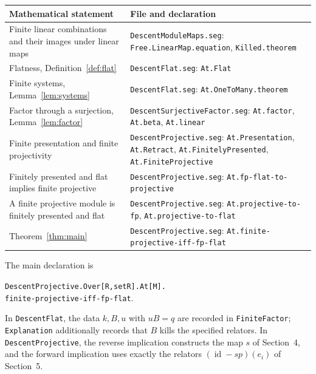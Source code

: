 \documentclass[11pt]{amsart}
\theoremstyle{definition}
\newcommand{\id}{\operatorname{id}}
\newcommand{\code}[1]{\texttt{#1}}
\begin{document}
\smallskip
\noindent
\begin{tabularx}{\textwidth}{@{}>{\raggedright\arraybackslash}p{}>{\raggedright\arraybackslash}X@{}}
\textbf{Mathematical statement} & \textbf{File and declaration} \\
\hline
Finite linear combinations and their images under linear maps &
\code{DescentModuleMaps.seg}: \code{Free.LinearMap.equation},
\code{Killed.theorem} \\[4pt]
Flatness, Definition~\ref{def:flat} &
\code{DescentFlat.seg}: \code{At.Flat} \\[4pt]
Finite systems, Lemma~\ref{lem:systems} &
\code{DescentFlat.seg}: \code{At.OneToMany.theorem} \\[4pt]
Factor through a surjection, Lemma~\ref{lem:factor} &
\code{DescentSurjectiveFactor.seg}: \code{At.factor},
\code{At.beta}, \code{At.linear} \\[4pt]
Finite presentation and finite projectivity &
\code{DescentProjective.seg}: \code{At.Presentation},
\code{At.Retract}, \code{At.FinitelyPresented},
\code{At.FiniteProjective} \\[4pt]
Finitely presented and flat implies finite projective &
\code{DescentProjective.seg}: \code{At.fp-flat-to-projective} \\[4pt]
A finite projective module is finitely presented and flat &
\code{DescentProjective.seg}: \code{At.projective-to-fp},
\code{At.projective-to-flat} \\[4pt]
Theorem~\ref{thm:main} &
\code{DescentProjective.seg}: \code{At.finite-projective-iff-fp-flat}
\end{tabularx}

\medskip
The main declaration is
\begin{center}
\code{DescentProjective.Over[R,setR].At[M].}\\
\code{finite-projective-iff-fp-flat}.
\end{center}
In \code{DescentFlat}, the data $k,B,u$ with $uB=q$ are recorded in
\code{FiniteFactor}; \code{Explanation} additionally records that $B$
kills the specified relators. In \code{DescentProjective}, the reverse
implication constructs the map $s$ of Section~4, and the forward
implication uses exactly the relators $(\id-sp)(e_i)$ of Section~5.
\end{document}
